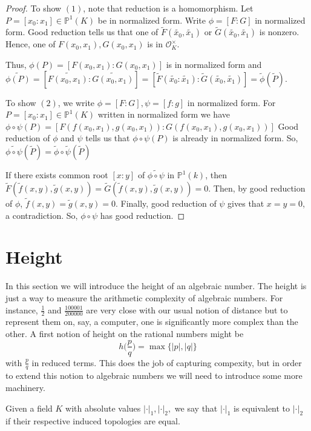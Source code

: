 \documentclass[12pt]{amsart}
\theoremstyle{definition}
\theoremstyle{remark}
\theoremstyle{definition}
\newcommand{\MCO}{\mathcal{O}}
\begin{document}
\begin{proof}
To show $(1)$, note that reduction is a homomorphism.  Let $P=[x_0:x_1] \in \mathbb{P}^1(K) $ be in normalized form.   Write $\phi = [F:G]$ in normalized form.  
Good reduction tells us that one of $\tilde{F}(\tilde{x_0}, \tilde{x_1})$ or $\tilde{G}(\tilde{x_0}, \tilde{x_1})$ is nonzero.  Hence, one of $F(x_0,x_1), G(x_0,x_1)$ is in $\MCO_K^{\times}$. 

Thus, $\phi(P)=[F(x_0,x_1): G(x_0,x_1)]$ is in normalized form and $\widetilde{\phi(P)}=[\widetilde{F(x_0,x_1)}:\widetilde{G(x_0,x_1)}]=[\tilde{F}(\tilde{x_0}: \tilde{x_1}): \tilde{G}(\tilde{x_0}, \tilde{x_1})]=\tilde{\phi}(\tilde{P})$. 

To show $(2)$, we write $\phi=[F:G], \psi=[f:g]$ in normalized form. For $P=[x_0:x_1] \in \mathbb{P}^1(K)$ written in normalized form we have $\phi \circ \psi (P)=[F(f(x_0,x_1),g(x_0,x_1)):G(f(x_0,x_1),g(x_0,x_1))]$
Good reduction of $\phi$ and $\psi$ tells us that $\phi \circ \psi(P)$ is already in normalized form. So, $\widetilde{\phi \circ \psi}(\tilde{P})=\tilde{\phi}\circ \tilde{\psi}(\tilde{P})$

If there exists common root $[x:y]$ of $\widetilde{\phi \circ \psi}$ in $\mathbb{P}^1(k)$, then  $\tilde{F}(\tilde{f}(x,y),\tilde{g}(x,y))=\tilde{G}(\tilde{f}(x,y),\tilde{g}(x,y))=0$. Then, by good reduction of $\phi$, $\tilde{f}(x,y)=\tilde{g}(x,y)=0$. Finally, good reduction of $\psi$ gives that $x=y=0$, a contradiction.  So, $\phi \circ \psi$ has good reduction. 
\end{proof} 


\section{Height}

In this section we will introduce the height of an algebraic number. The height is just a way to measure the arithmetic complexity of algebraic numbers. For instance, $\frac{1}{2}$ and $\frac{100001}{200000}$ are very close with our usual notion of distance but to represent them on, say, a computer, one is significantly more complex than the other. A first notion of height on the rational numbers might be $$h\bigg(\frac{p}{q}\bigg) =  \max\{|p|,|q|\}$$ with $\frac{p}{q}$ in reduced terms. This does the job of capturing compexity, but in order to extend this notion to algebraic numbers we will need to introduce some more machinery.

Given a field $K$ with absolute values $|\cdot |_1, |\cdot |_2, $ we say that $|\cdot |_1$ is equivalent to $|\cdot |_2$ if their respective induced topologies are equal.  
\end{document}
